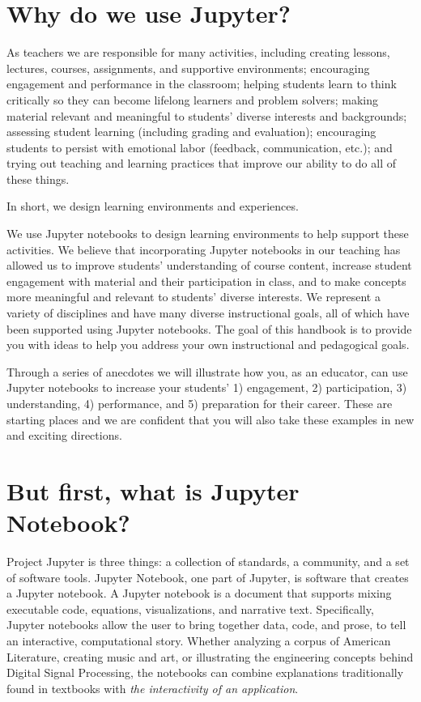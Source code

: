 \documentclass[]{book}
\begin{document}
\hypertarget{why-do-we-use-jupyter}{%
\section{Why do we use Jupyter?}\label{why-do-we-use-jupyter}}

As teachers we are responsible for many activities, including creating lessons,
lectures, courses, assignments, and supportive environments; encouraging
engagement and performance in the classroom; helping students learn to think
critically so they can become lifelong learners and problem solvers; making
material relevant and meaningful to students' diverse interests and backgrounds;
assessing student learning (including grading and evaluation); encouraging
students to persist with emotional labor (feedback, communication, etc.); and
trying out teaching and learning practices that improve our ability to do all of
these things.

In short, we design learning environments and experiences.

We use Jupyter notebooks to design learning environments to help support these
activities. We believe that incorporating Jupyter notebooks in our teaching has
allowed us to improve students' understanding of course content, increase
student engagement with material and their participation in class, and to make
concepts more meaningful and relevant to students' diverse interests. We
represent a variety of disciplines and have many diverse instructional goals,
all of which have been supported using Jupyter notebooks. The goal of this
handbook is to provide you with ideas to help you address your own instructional
and pedagogical goals.

Through a series of anecdotes we will illustrate how you, as an educator, can
use Jupyter notebooks to increase your students' 1) engagement, 2)
participation, 3) understanding, 4) performance, and 5) preparation for their
career. These are starting places and we are confident that you will also take
these examples in new and exciting directions.

\hypertarget{but-first-what-is-jupyter-notebook}{%
\section{But first, what is Jupyter Notebook?}\label{but-first-what-is-jupyter-notebook}}

Project Jupyter is three things: a collection of standards, a
community, and a set of software tools. Jupyter Notebook, one part of
Jupyter, is software that creates a Jupyter notebook.
A Jupyter notebook is a document that supports mixing executable code, equations,
visualizations, and narrative text. Specifically, Jupyter notebooks allow
the user to bring together data, code, and prose, to tell an
interactive, computational story. Whether analyzing a corpus of American
Literature, creating music and art, or illustrating the engineering concepts
behind Digital Signal Processing, the notebooks can combine explanations
traditionally found in textbooks with \emph{the interactivity of an application}.
\end{document}
